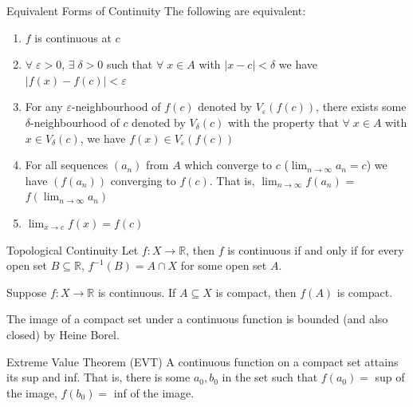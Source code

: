 \documentclass[12pt]{article}
\begin{document}
\begin{theorem}{Equivalent Forms of Continuity}{}
    The following are equivalent:
    \begin{enumerate}[label = {(\roman*)}]
        \item $ f $ is continuous at $ c $
        \item $ \forall \; \varepsilon > 0 $, $ \exists \; \delta > 0 $ such that $ \forall \; x \in A $ with $ \left| x - c \right| < \delta $ we have $ \left| f \left( x \right) - f \left( c \right) \right| < \varepsilon $
        \item For any $ \varepsilon $-neighbourhood of $ f \left( c \right) $ denoted by $ V_\varepsilon \left( f \left( c \right) \right) $, there exists some $ \delta $-neighbourhood of $ c $ denoted by $ V_\delta \left( c \right) $ with the property that $ \forall \; x \in A $ with $ x \in V_\delta \left( c \right) $, we have $ f \left( x \right) \in V_\varepsilon \left( f \left( c \right) \right) $
        \item For all sequences $ \left( a_n \right) $ from $ A $ which converge to $ c $ ($ \lim_{n \to \infty} a_n = c $) we have $ \left( f \left( a_n \right) \right) $ converging to $ f \left( c \right) $.
        That is, $ \lim_{n \to \infty} f \left( a_n \right) $ = $ f \left( \lim_{n \to \infty} a_n \right) $
        \item $ \lim_{x \to c} f \left( x \right) = f \left( c \right) $
    \end{enumerate}
\end{theorem}
\begin{theorem}{Topological Continuity}{}
    Let $ f : X \to \mathbb{R} $, then $ f $ is continuous if and only if for every open set $ B \subseteq \mathbb{R} $, $ f^{-1} \left( B \right) = A \cap X $ for some open set $ A $.
\end{theorem}
\begin{theorem}{}{}
    Suppose $ f : X \to \mathbb{R} $ is continuous. If $ A \subseteq X $ is compact, then $ f \left( A \right) $ is compact.
\end{theorem}
\begin{corollary}{}{}
    The image of a compact set under a continuous function is bounded (and also closed) by Heine Borel.
\end{corollary}
\begin{theorem}{Extreme Value Theorem (EVT)}{}
    A continuous function on a compact set attains its sup and inf. That is, there is some $ a_0, b_0 $ in the set such that $ f \left( a_0  \right) = $ sup of the image, $ f \left( b_0 \right) = $ inf of the image.
\end{theorem}
\end{document}
